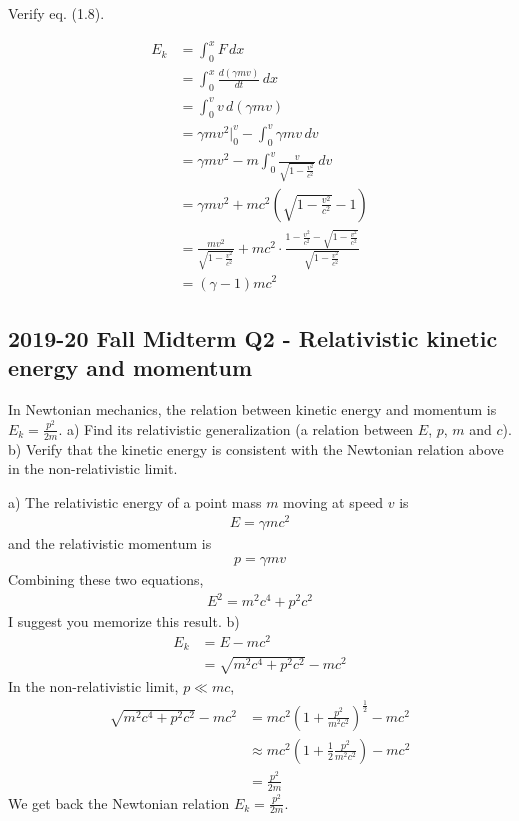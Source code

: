 \documentclass[12pt]{book} %
\numberwithin{equation}{chapter}
\def\c{\gamma}
\begin{document}
\begin{problem}
Verify eq. (1.8).
\end{problem}
\begin{solbox}
\begin{align*}
E_{k}&=\int_{0}^{x}F\,dx\\
&=\int_{0}^{x}\frac{d\left(\c mv\right)}{dt}\,dx\\
&=\int_{0}^{v} v\,d\left(\c mv\right)\\
&=\c mv^{2}\big|^{v}_{0}-\int_{0}^{v} \c mv\,dv\\
&=\c mv^{2}-m\int_{0}^{v} \frac{v}{\sqrt{1-\frac{v^2}{c^2}}}\,dv\\
&=\c mv^{2}+mc^{2}\left(\sqrt{1-\frac{v^2}{c^2}}-1\right)\\
&=\frac{mv^2}{\sqrt{1-\frac{v^2}{c^2}}}+mc^{2}\cdot\frac{1-\frac{v^2}{c^2}-\sqrt{1-\frac{v^2}{c^2}}}{\sqrt{1-\frac{v^2}{c^2}}}\\
&=\left(\c-1\right)mc^2
\end{align*}
\end{solbox}

\subsection*{2019-20 Fall Midterm Q2 - Relativistic kinetic energy and momentum}
In Newtonian mechanics, the relation between kinetic energy and momentum is $E_{k}=\frac{p^2}{2m}$.\bigskip\newline
a) Find its relativistic generalization (a relation between $E$, $p$, $m$ and $c$).\bigskip\newline
b) Verify that the kinetic energy is consistent with the Newtonian relation above in the non-relativistic limit.

\begin{solbox}
a) The relativistic energy of a point mass $m$ moving at speed $v$ is
\begin{align}
E=\c mc^{2}\nonumber
\end{align}
and the relativistic momentum is
\begin{align}
p=\c mv\nonumber
\end{align}
Combining these two equations,
\begin{align}
E^2=m^2 c^4+p^2 c^2\nonumber
\end{align}
I suggest you memorize this result.\bigskip\newline
b)
\begin{align*}
E_{k}&=E-mc^2\\
&=\sqrt{m^2 c^4+p^2 c^2}-mc^2
\end{align*}
In the non-relativistic limit, $p\ll mc$, 
\begin{align*}
\sqrt{m^2 c^4+p^2 c^2}-mc^2&=mc^2{\left(1+\frac{p^2}{m^2 c^2}\right)}^{\frac{1}{2}}-mc^2\\
&\approx mc^2\left(1+\frac{1}{2}\frac{p^2}{m^2 c^2}\right)-mc^2\\
&=\frac{p^2}{2m}
\end{align*}
We get back the Newtonian relation $E_{k}=\frac{p^2}{2m}$.
\end{solbox}
\end{document}
